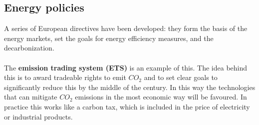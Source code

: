 \documentclass[../summary.tex]{subfiles}
\begin{document}
	\subsection{Energy policies}
	
	A series of European directives have been developed: they form the basis of the energy markets, set the goals for energy efficiency measures, and the decarbonization. 
	\\\\
	The \textbf{emission trading system (ETS)} is an example of this. The idea behind this is to award tradeable rights to emit $CO_2$ and to set clear goals to significantly reduce this by the middle of the century. In this way the technologies that can mitigate $CO_2$ emissions in the most economic way will be favoured. In practice this works like a carbon tax, which is included in the price of electricity or industrial products.
	
\end{document}
